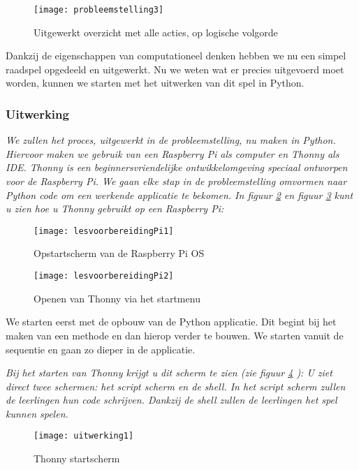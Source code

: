 \begin{figure}
    \texttt{[image: probleemstelling3]}
    \caption{Uitgewerkt overzicht met alle acties, op logische volgorde}
    \label{fig:lesvoor_prob3}
\end{figure}

Dankzij de eigenschappen van computationeel denken hebben we nu een simpel raadspel opgedeeld en uitgewerkt. Nu we weten wat er precies uitgevoerd moet worden, kunnen we starten met het uitwerken van dit spel in Python.

\subsubsection{Uitwerking}
\emph{We zullen het proces, uitgewerkt in de probleemstelling, nu maken in Python. Hiervoor maken we gebruik van een Raspberry Pi als computer en Thonny als IDE. Thonny is een beginnersvriendelijke ontwikkelomgeving speciaal ontworpen voor de Raspberry Pi. We gaan elke stap in de probleemstelling omvormen naar Python code om een werkende applicatie te bekomen. In figuur \ref{fig:lesvoor_rasp1} en figuur \ref{fig:lesvoor_rasp2} kunt u zien hoe u Thonny gebruikt op een Raspberry Pi:}

\begin{figure}
    \texttt{[image: lesvoorbereidingPi1]}
    \caption{Opstartscherm van de Raspberry Pi OS}
    \label{fig:lesvoor_rasp1}
\end{figure}

\begin{figure}
    \texttt{[image: lesvoorbereidingPi2]}
    \caption{Openen van Thonny via het startmenu}
    \label{fig:lesvoor_rasp2}
\end{figure}

We starten eerst met de opbouw van de Python applicatie. Dit begint bij het maken van een methode en dan hierop verder te bouwen. We starten vanuit de sequentie en gaan zo dieper in de applicatie. 

\emph{Bij het starten van Thonny krijgt u dit scherm te zien (zie figuur \ref{fig:uitwerking1} ):
    U ziet direct twee schermen: het script scherm en de shell. In het script scherm zullen de leerlingen hun code schrijven. Dankzij de shell zullen de leerlingen het spel kunnen spelen.}

\begin{figure}
    \texttt{[image: uitwerking1]}
    \caption{Thonny startscherm}
    \label{fig:uitwerking1}
\end{figure}


